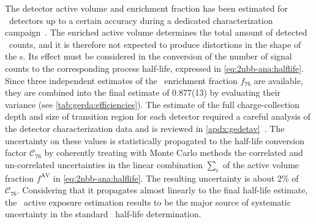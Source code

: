 \begin{description}[wide]
  \item[\gesix\ active exposure] The detector active volume and enrichment fraction has
    been estimated for \bege\ detectors up to a certain accuracy during a dedicated
    characterization campaign~\cite{Agostini2015e, Agostini2019}. The enriched active
    volume determines the total amount of detected \nnbb\ counts, and it is therefore not
    expected to produce distortions in the shape of the \pdf{}s. Its effect must be
    considered in the conversion of the number of signal counts to the corresponding
    process half-life, expressed in \cref{eq:2nbb-ana:halflife}.  Since three independent
    estimates of the \bege\ enrichment fraction $f_{76}$ are
    available\cite{Agostini2015e},
    they are combined into the final estimate of 0.877(13) by evaluating their variance
    (see \cref{tab:gerda:efficiencies}). The estimate of the full charge-collection depth
    and size of transition region for each detector required a careful analysis of the
    detector characterization data and is reviewed in
    \cref{apdx:gedetav}~\cite{Agostini2019, Lehnert2016}. The uncertainty on these values
    is statistically propagated to the half-life conversion factor $\mathcal{C}_{76}$ by
    coherently treating with Monte Carlo methods the correlated and un-correlated
    uncertainties in the linear combination $\sum_i$ of the active volume fraction
    $f^\text{AV}$ in \cref{eq:2nbb-ana:halflife}. The resulting uncertainty is about 2\%
    of $\mathcal{C}_{76}$. Considering that it propagates almost linearly to the final
    half-life estimate, the \gesix\ active exposure estimation results to be the major
    source of systematic uncertainty in the standard \nnbb\ half-life determination.


\end{description}
